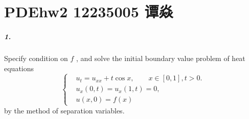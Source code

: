 \documentclass[a4paper]{book}
\numberwithin{equation}{chapter}
\theoremstyle{definition}
\begin{document}
\pagestyle{plain}


\pagestyle{fancy}
\chapter{PDEhw2 12235005 谭焱}

\paragraph*{1. }
Specify condition on $f$ , and solve the initial boundary value problem of heat
equations
\begin{equation}
    \left\{
    \begin{aligned}
         & u_t = u_{xx} + t \cos x, \qquad x \in [0, 1], t > 0. \\
         & u_x(0, t) = u_x(1, t) = 0,                           \\
         & u(x, 0) = f(x)
    \end{aligned}
    \right.
\end{equation}
by the method of separation variables.
\end{document}
